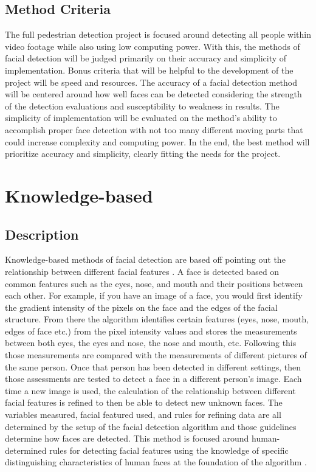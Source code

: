 \documentclass[onecolumn, draftclsnofoot,10pt, compsoc]{IEEEtran}
\begin{document}
\subsection{Method Criteria}
The full pedestrian detection project is focused around detecting all people within video footage while also using low computing power. With this, the methods of facial detection will be judged primarily on their accuracy and simplicity of implementation. Bonus criteria that will be helpful to the development of the project will be speed and resources. The accuracy of a facial detection method will be centered around how well faces can be detected considering the strength of the detection evaluations and susceptibility to weakness in results. The simplicity of implementation will be evaluated on the method's ability to accomplish proper face detection with not too many different moving parts that could increase complexity and computing power. In the end, the best method will prioritize accuracy and simplicity, clearly fitting the needs for the project.

\section{Knowledge-based}

\subsection{Description}
Knowledge-based methods of facial detection are based off pointing out the relationship between different facial features \cite{Medium}. A face is detected based on common features such as the eyes, nose, and mouth and their positions between each other. For example, if you have an image of a face, you would first identify the gradient intensity of the pixels on the face and the edges of the facial structure. From there the algorithm identifies certain features (eyes, nose, mouth, edges of face etc.) from the pixel intensity values and stores the measurements between both eyes, the eyes and nose, the nose and mouth, etc. \cite{Medium} Following this those measurements are compared with the measurements of different pictures of the same person. Once that person has been detected in different settings, then those assessments are tested to detect a face in a different person's image. Each time a new image is used, the calculation of the relationship between different facial features is refined to then be able to detect new unknown faces. The variables measured, facial featured used, and rules for refining data are all determined by the setup of the facial detection algorithm and those guidelines determine how faces are detected. This method is focused around human-determined rules for detecting facial features using the knowledge of specific distinguishing characteristics of human faces at the foundation of the algorithm \cite{Medium}.
\end{document}
